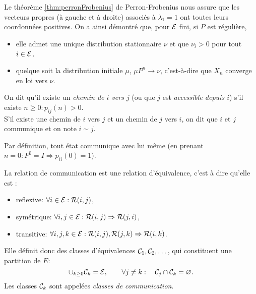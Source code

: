 \remark
Le théorème \ref{thm:perronFrobenius} de Perron-Frobenius nous assure que les vecteurs propres (à gauche et à droite) associés à $\lambda_1 = 1$ ont toutes leurs coordonnées positives. On a ainsi démontré que, pour $\mathcal{E}$ fini, si $P$ est régulière, 
\begin{itemize}
  \item elle admet une unique distribution stationnaire $\nu$ et que $\nu_i > 0$ pour tout $i \in \mathcal{E}$, 
  \item quelque soit la distribution initiale $\mu$, $\mu P^n \to \nu$, c'est-à-dire que $X_n$ converge en loi vers $\nu$.
\end{itemize}


\begin{definition}
  On dit qu'il existe un {\em chemin de $i$ vers $j$} (ou que $j$ est {\em accessible depuis $i$}) s'il existe $n \geq 0: p_{ij}(n) > 0$. \\
  S'il existe une chemin de $i$ vers $j$ et un chemin de $j$ vers $i$, on dit que $i$ et $j$ communique et on note $i \sim j$.
\end{definition}

\remark
Par définition, tout état communique avec lui même (en prenant $n= 0 : P^0 = I \Rightarrow p_{ii}(0) = 1$).

La relation de communication est une relation d'équivalence, c'est à dire qu'elle est :
\begin{itemize}
  \item reflexive: $\forall i \in \mathcal{E}: \mathcal{R}(i, j)$,
  \item symétrique: $\forall i, j \in \mathcal{E}: \mathcal{R}(i, j) \Rightarrow \mathcal{R}(j, i)$,
  \item transitive: $\forall i, j, k \in \mathcal{E}: \mathcal{R}(i, j), \mathcal{R}(j, k) \Rightarrow \mathcal{R}(i, k)$.
\end{itemize}
Elle définit donc des classes d'équivalences $\mathcal{C}_1, \mathcal{C}_2, \dots $, qui constituent une partition de $E$:
$$
\cup_{k \geq 0} \mathcal{C}_k = \mathcal{E}, \qquad \forall j \neq k: \quad \mathcal{C}_j \cap \mathcal{C}_k = \varnothing.
$$
Les classes $\mathcal{C}_k$ sont appelées {\em classes de communication}.

